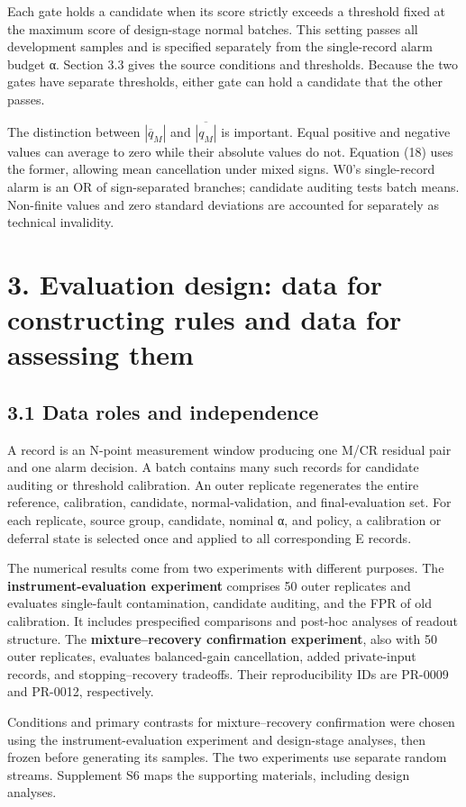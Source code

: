 \documentclass[10pt,a4paper]{article}
\begin{document}
Each gate holds a candidate when its score strictly exceeds a threshold fixed at the maximum score of design-stage normal batches. This setting passes all development samples and is specified separately from the single-record alarm budget α. Section 3.3 gives the source conditions and thresholds. Because the two gates have separate thresholds, either gate can hold a candidate that the other passes.

The distinction between \(|\overline q_M|\) and \(\overline{|q_M|}\) is important. Equal positive and negative values can average to zero while their absolute values do not. Equation (18) uses the former, allowing mean cancellation under mixed signs. W0's single-record alarm is an OR of sign-separated branches; candidate auditing tests batch means. Non-finite values and zero standard deviations are accounted for separately as technical invalidity.

\section{3. Evaluation design: data for constructing rules and data for assessing them}

\subsection{3.1 Data roles and independence}

A record is an N-point measurement window producing one M/CR residual pair and one alarm decision. A batch contains many such records for candidate auditing or threshold calibration. An outer replicate regenerates the entire reference, calibration, candidate, normal-validation, and final-evaluation set. For each replicate, source group, candidate, nominal α, and policy, a calibration or deferral state is selected once and applied to all corresponding E records.

The numerical results come from two experiments with different purposes. The \textbf{instrument-evaluation experiment} comprises 50 outer replicates and evaluates single-fault contamination, candidate auditing, and the FPR of old calibration. It includes prespecified comparisons and post-hoc analyses of readout structure. The \textbf{mixture–recovery confirmation experiment}, also with 50 outer replicates, evaluates balanced-gain cancellation, added private-input records, and stopping–recovery tradeoffs. Their reproducibility IDs are PR-0009 and PR-0012, respectively.

Conditions and primary contrasts for mixture–recovery confirmation were chosen using the instrument-evaluation experiment and design-stage analyses, then frozen before generating its samples. The two experiments use separate random streams. Supplement S6 maps the supporting materials, including design analyses.
\end{document}
